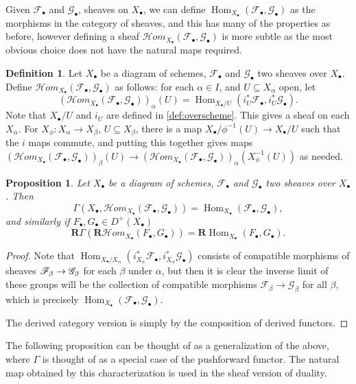 \documentclass[proquest]{uwthesis}[2014/11/13]
\newtheorem{prop}[theorem]{Proposition}
\theoremstyle{definition}
\newtheorem{definition}[theorem]{Definition}
\DeclareMathOperator{\Hom}{Hom}
\newcommand{\cHom}{\mathcal{H} \textit{om}}
\newcommand{\FF}{\mathscr{F}}
\newcommand{\GG}{\mathscr{G}}
\newcommand{\bR}{\textbf{R}}
\begin{document}
Given $\FF_\bullet$ and $\GG_\bullet$, sheaves on $X_\bullet$, we can define $\Hom_{X_\bullet}(\FF_\bullet, \GG_\bullet)$ as the morphisms in the category of sheaves, and this has many of the properties as before, however defining a sheaf $\cHom_{X_\bullet}(\FF_\bullet, \GG_\bullet)$ is more subtle as the most obvious choice does not have the natural maps required.
\begin{definition}
	Let $X_\bullet$ be a diagram of schemes, $\FF_\bullet$ and $\GG_\bullet$ two sheaves over $X_\bullet$.
	Define $\cHom_{X_\bullet}(\FF_\bullet, \GG_\bullet)$ as follows: for each $\alpha \in I$, and $U \subseteq X_\alpha$ open, let
	\[
	(\cHom_{X_\bullet}(\FF_\bullet, \GG_\bullet))_\alpha(U) = \Hom_{X_\bullet/U} ( i_U^* \FF_\bullet , i_U^* \GG_\bullet).
	\]
	Note that $X_\bullet/U$ and $i_U$ are defined in \ref{def:overscheme}. This gives a sheaf on each $X_\alpha$.
	For ${X_\phi : X_\alpha \rightarrow X_\beta}$, $U \subseteq X_\beta$, there is a map $X_\bullet / \phi^{-1}(U) \rightarrow X_\bullet / U$ such that the $i$ maps commute, and putting this together gives maps $(\cHom_{X_\bullet}(\FF_\bullet, \GG_\bullet))_\beta(U) \rightarrow (\cHom_{X_\bullet}(\FF_\bullet, \GG_\bullet))_\alpha(X_\phi^{-1}(U))$ as needed.
\end{definition}

\begin{prop}
	Let $X_\bullet$ be a diagram of schemes, $\FF_\bullet$ and $\GG_\bullet$ two sheaves over $X_\bullet$.
	Then
	\[
	\Gamma(X_\bullet, \cHom_{X_\bullet}(\FF_\bullet, \GG_\bullet)) = \Hom_{X_\bullet}(\FF_\bullet, \GG_\bullet),
	\]
	and similarly if $F_\bullet, G_\bullet \in D^+(X_\bullet)$
	\[
	\bR \Gamma (\bR \cHom_{X_\bullet}(F_\bullet, G_\bullet)) = \bR \Hom_{X_\bullet}(F_\bullet, G_\bullet).
	\]
\end{prop}
\begin{proof}
	Note that $ \Hom_{X_\bullet / X_\alpha} ( i_{X_\alpha}^* \FF_\bullet , i_{X_\alpha}^* \GG_\bullet)$ consists of compatible morphisms of sheaves $\FF_\beta \rightarrow\nobreak \GG_\beta$ for each $\beta$ under $\alpha$, but then it is clear the inverse limit of these groups will be the collection of compatible morphisms $\FF_\beta \rightarrow \GG_\beta$ for all $\beta$, which is precisely $\Hom_{X_\bullet}(\FF_\bullet, \GG_\bullet)$.
	
	The derived category version is simply by the composition of derived functors.
\end{proof}

The following proposition can be thought of as a generalization of the above, where $\Gamma$ is thought of as a special case of the pushforward functor. 
The natural map obtained by this characterization is used in the sheaf version of duality.
\end{document}
